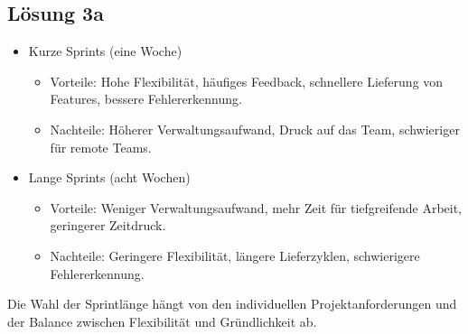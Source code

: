 \documentclass[main.tex]{subfiles}
\begin{document}
\subsection{Lösung 3a}
\begin{itemize}
    \item Kurze Sprints (eine Woche)
    \begin{itemize}
        \item Vorteile: Hohe Flexibilität, häufiges Feedback, schnellere Lieferung von Features, bessere Fehlererkennung.
        \item Nachteile: Höherer Verwaltungsaufwand, Druck auf das Team, schwieriger für remote Teams.
    \end{itemize}
    \item Lange Sprints (acht Wochen)
    \begin{itemize}
        \item Vorteile: Weniger Verwaltungsaufwand, mehr Zeit für tiefgreifende Arbeit, geringerer Zeitdruck.
        \item Nachteile: Geringere Flexibilität, längere Lieferzyklen, schwierigere Fehlererkennung.
    \end{itemize}
\end{itemize}

Die Wahl der Sprintlänge hängt von den individuellen Projektanforderungen und der Balance zwischen Flexibilität und Gründlichkeit ab.
\end{document}
